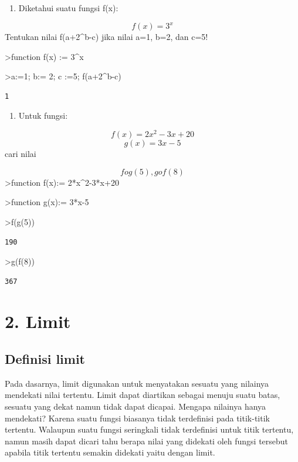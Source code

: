 \documentclass[
]{book}
\providecommand{\tightlist}{%
  \setlength{\itemsep}{0pt}\setlength{\parskip}{0pt}}
\begin{document}
\begin{enumerate}
\def\labelenumi{\arabic{enumi}.}
\setcounter{enumi}{3}
\tightlist
\item
  Diketahui suatu fungsi f(x):
\end{enumerate}

\[f(x)=3^x\]Tentukan nilai f(a+2\^{}b-c) jika nilai a=1, b=2, dan c=5!

\textgreater function f(x) := 3\^{}x

\textgreater a:=1; b:= 2; c :=5; f(a+2\^{}b-c)

\begin{verbatim}
1
\end{verbatim}

\begin{enumerate}
\def\labelenumi{\arabic{enumi}.}
\setcounter{enumi}{4}
\tightlist
\item
  Untuk fungsi:
\end{enumerate}

\[f(x) = 2x^2-3x+20\]\[g(x)= 3x-5\]cari nilai

\[fog(5), gof(8)\]\textgreater function f(x):= 2*x\^{}2-3*x+20

\textgreater function g(x):= 3*x-5

\textgreater f(g(5))

\begin{verbatim}
190
\end{verbatim}

\textgreater g(f(8))

\begin{verbatim}
367
\end{verbatim}

\chapter{2. Limit}\label{limit}

\section{Definisi limit}\label{definisi-limit}

Pada dasarnya, limit digunakan untuk menyatakan sesuatu yang nilainya mendekati nilai tertentu. Limit dapat diartikan sebagai menuju suatu batas, sesuatu yang dekat namun tidak dapat dicapai. Mengapa nilainya hanya mendekati? Karena suatu fungsi biasanya tidak terdefinisi pada titik-titik tertentu. Walaupun suatu fungsi seringkali tidak terdefinisi untuk titik tertentu, namun masih dapat dicari tahu berapa nilai yang didekati oleh fungsi tersebut apabila titik tertentu semakin didekati yaitu dengan limit.
\end{document}
